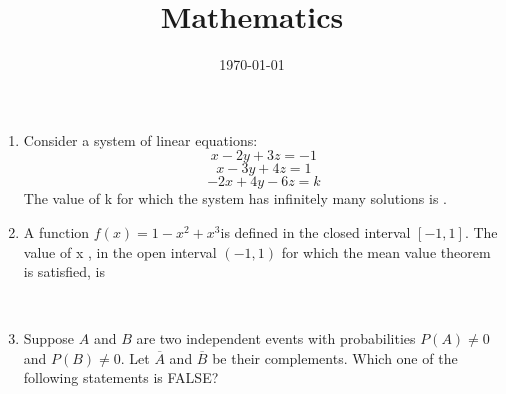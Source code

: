 \documentclass[12pt,-letter paper]{article}
\title{Mathematics}
\date{\today}
\theoremstyle{remark}
\begin{document}
\graphicspath{{/storage/emulated/0/Pictures/Telegram/}}
\begin{enumerate}
\subsection*{Questions 1-25 carry 1 mark each}
    \item Consider a system of linear equations:  \[x-2y+3z=-1\] \[x-3y+4z=1\] \[-2x+4y-6z=k\]
The value of k for which the system has infinitely many solutions is \underline{\hspace{1cm}}.
    \item A function \(f(x)=1-x^2+x^3\)is defined in the closed interval $[-1,1]$. The value of x , in the open interval $(-1,1)$ for which the mean value theorem is satisfied, is\\
\\
    \item Suppose $A$ and $B$ are two independent events with probabilities $P(A)\neq 0$ and $P(B) \neq 0$. Let $\overline{A}$ and $\overline{B}$ be their complements. Which one of the following statements is FALSE?\\


\end{enumerate}
\end{document}
